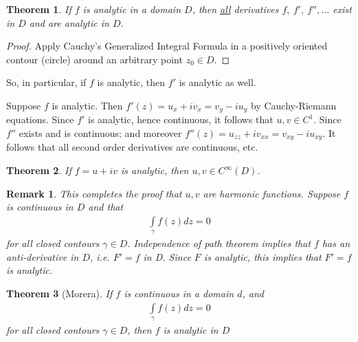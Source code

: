 \documentclass[12pt, a4paper]{article}
\theoremstyle{plain}
\newtheorem{thm}{Theorem} %
\newtheorem{rem}{Remark}
\theoremstyle{definition}
\begin{document}
		\begin{thm}
			If $f$ is analytic in a domain $D$, then \underline{all} derivatives $f,\:f',\:f'',\ldots$ exist in $D$ and are analytic in $D$.
		\end{thm}

		\begin{proof}
			Apply Cauchy's Generalized Integral Formula in a positively oriented contour (circle) around an arbitrary point $z_0\in D$.
		\end{proof}

		So, in particular, if $f$ is analytic, then $f'$ is analytic as well.

		Suppose $f$ is analytic. Then $f'(z) = u_x+iv_x = v_y-iu_y$ by Cauchy-Riemann equations. Since $f'$ is analytic, hence continuous, it follows that $u,v\in C^1$. Since $f''$ exists and is continuous; and moreover $f''(z)=u_{zz}+iv_{xx} = v_{xy}-iu_{xy}$. It follows that all second order derivatives are continuous, etc.\\

		\begin{thm}
			If $f=u+iv$ is analytic, then $u,v\in C^\infty(D)$.\\
		\end{thm}

		\begin{rem}
			This completes the proof that $u,v$ are harmonic functions. Suppose $f$ is continuous in $D$ and that
			\begin{align*}
				\int\limits_{\gamma}f(z)dz = 0
			\end{align*}
			for all closed contours $\gamma\in D$. Independence of path theorem implies that $f$ has an anti-derivative in $D$, i.e. $F'=f$ in D. Since $F$ is analytic, this implies that $F'=f$ is analytic.\\
		\end{rem}

		\begin{thm}[Morera]
			If $f$ is continuous in a domain $d$, and
			\begin{align*}
				\int\limits_{\gamma}f(z)dz=0
			\end{align*}
			for all closed contours $\gamma\in D$, then $f$ is analytic in $D$
		\end{thm}
\end{document}
